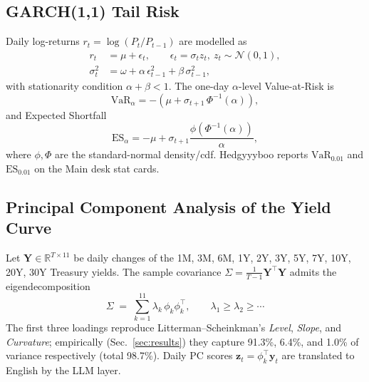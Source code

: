 \documentclass[conference]{IEEEtran}
\begin{document}
\subsection{GARCH(1,1) Tail Risk}
\label{sec:garch}
Daily log-returns $r_t=\log(P_t/P_{t-1})$ are modelled as
\begin{align}
r_t &= \mu + \epsilon_t,\qquad \epsilon_t = \sigma_t z_t,\ z_t\!\sim\!\mathcal{N}(0,1),\\
\sigma_t^2 &= \omega + \alpha\,\epsilon_{t-1}^2 + \beta\,\sigma_{t-1}^2,
\label{eq:garch}
\end{align}
with stationarity condition $\alpha+\beta<1$. The one-day $\alpha$-level Value-at-Risk is
\begin{equation}
\text{VaR}_\alpha = -\left(\mu + \sigma_{t+1}\,\Phi^{-1}(\alpha)\right),
\end{equation}
and Expected Shortfall
\begin{equation}
\text{ES}_\alpha = -\mu + \sigma_{t+1}\frac{\phi(\Phi^{-1}(\alpha))}{\alpha},
\label{eq:es}
\end{equation}
where $\phi,\Phi$ are the standard-normal density/cdf. Hedgyyyboo reports $\text{VaR}_{0.01}$ and $\text{ES}_{0.01}$ on the Main desk stat cards.

\subsection{Principal Component Analysis of the Yield Curve}
\label{sec:pca}
Let $\mathbf Y\in\mathbb{R}^{T\times 11}$ be daily changes of the 1M, 3M, 6M, 1Y, 2Y, 3Y, 5Y, 7Y, 10Y, 20Y, 30Y Treasury yields. The sample covariance $\Sigma=\tfrac{1}{T-1}\mathbf Y^\top\mathbf Y$ admits the eigendecomposition
\begin{equation}
\Sigma \;=\; \sum_{k=1}^{11}\lambda_k\,\phi_k\phi_k^\top,\qquad \lambda_1\!\geq\!\lambda_2\!\geq\!\cdots
\end{equation}
The first three loadings reproduce Litterman--Scheinkman's \emph{Level}, \emph{Slope}, and \emph{Curvature}; empirically (Sec.~\ref{sec:results}) they capture 91.3\%, 6.4\%, and 1.0\% of variance respectively (total 98.7\%). Daily PC scores $\mathbf z_t=\phi_k^\top \mathbf y_t$ are translated to English by the LLM layer.
\end{document}
